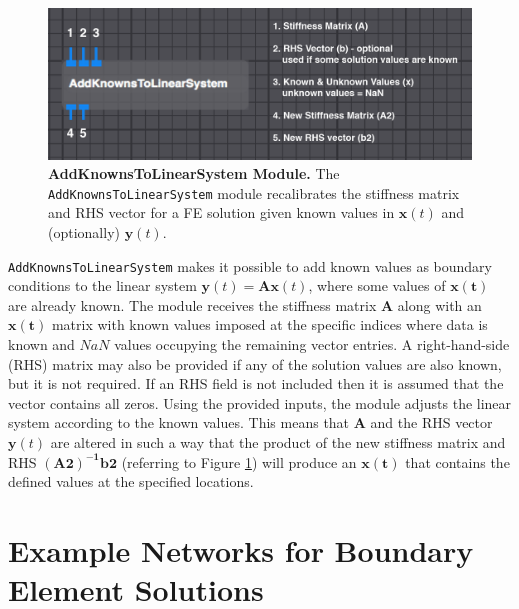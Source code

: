 \begin{figure}[b]
\begin{center}
\includegraphics[width=\textwidth]{ECGToolkitGuide_figures/AddKnowns.png}
\caption{{\bf AddKnownsToLinearSystem Module.} The {\tt AddKnownsToLinearSystem} module recalibrates  the stiffness matrix and RHS vector for a FE solution given known values in $\mathbf{x}(t)$ and (optionally) $\mathbf{y}(t)$.}
\label{fig:AddKnowns}
\end{center}
\vspace{-.25 in}
\end{figure}

{\tt AddKnownsToLinearSystem} makes it possible to add known values as boundary conditions
to the linear system $\mathbf{y}(t) = \mathbf{A}\mathbf{x}(t)$, where some values of
$\mathbf{x(t)}$ are already known. 
The module receives the stiffness matrix $\mathbf{A}$ along with an $\mathbf{x(t)}$ matrix with known values imposed at the specific indices where data is known and $NaN$ values occupying the remaining vector entries. 
A right-hand-side (RHS) matrix may also be provided if any of the solution values are also known, but it is not required. 
If an RHS field is not included then it is assumed that the vector contains all zeros. %
Using the provided inputs, the module adjusts the linear system according to the known values. 
This means that $\mathbf{A}$ and the RHS vector $\mathbf{y}(t)$ are altered in such a way that the product of the new stiffness matrix and RHS $\mathbf{(A2)^{-1}} \mathbf{b2}$ (referring to Figure \ref{fig:AddKnowns}) will produce an $\mathbf{x(t)}$ that contains the defined values at the specified locations. 

\section{Example Networks for Boundary Element Solutions}

